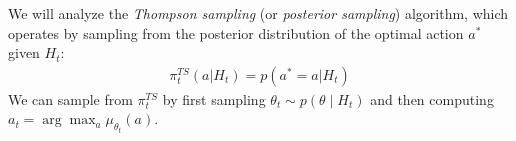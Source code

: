We will analyze the \textit{Thompson sampling} (or \textit{posterior sampling}) algorithm, which operates by sampling from the posterior distribution of the optimal action $a^*$ given $H_t$:
\begin{align*}
\pi^{TS}_{t}(a | H_{t}) = p(a^*=a | H_{t})
\end{align*}
We can sample from $\pi^{TS}_{t}$ by first sampling $\theta_t \sim p(\theta \mid H_t)$ and then computing $a_t = \arg\max_a \mu_{\theta_t}(a)$.


\begin{enumerate}[(a)]

	

	

	

	

	

	


\end{enumerate}